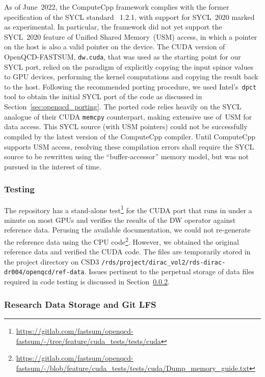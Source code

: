 \documentclass[../main]{subfiles}
\begin{document}
As of June~2022, the ComputeCpp framework complies with the former specification of the SYCL standard \viz~1.2.1, with support for SYCL~2020 marked as experimental.
In particular, the framework did not yet support the SYCL~2020 feature of Unified Shared Memory~(USM) access, in which a pointer on the host is also a valid pointer on the device.
The CUDA version of OpenQCD-FASTSUM, \texttt{dw.cuda}, that was used as the starting point for our SYCL port, relied on the paradigm of explicitly copying the input spinor values to GPU devices, performing the kernel computations and copying the result back to the host.
Following the recommended porting procedure, we used Intel's~\texttt{dpct} tool to obtain the initial SYCL port of the code as discussed in Section~\ref{sec:openqcd_porting}.
The ported code relies heavily on the SYCL analogue of their CUDA \texttt{memcpy} counterpart, making extensive use of~USM for data access.
This SYCL source (with USM pointers) could not be successfully compiled by the latest version of the ComputeCpp compiler.
Until ComputeCpp supports USM access, resolving these compilation errors shall require the SYCL source to be rewritten using the ``buffer-accessor'' memory model, but was not pursued in the interest of time.

\subsubsection{Testing}\label{testing_openqcd}

The repository has a stand-alone test\footnote{\url{https://gitlab.com/fastsum/openqcd-fastsum/-/tree/feature/cuda_tests/tests/cuda}} for the CUDA port that runs in under a minute on most GPUs and verifies the results of the DW operator against reference data.
Perusing the available documentation, we could not re-generate the reference data using the CPU code\footnote{\url{https://gitlab.com/fastsum/openqcd-fastsum/-/blob/feature/cuda_tests/tests/cuda/Dump_memory_guide.txt}}.
However, we obtained the original reference data and verified the CUDA code.
The files are temporarily stored in the project directory on CSD3 \texttt{/rds/project/dirac\_vol2/rds-dirac-dr004/openqcd/ref-data}.
Issues pertinent to the perpetual storage of data files required in code testing is discussed in Section~\ref{sec:gitlfs_rds}.

\subsubsection{Research Data Storage and Git LFS}\label{sec:gitlfs_rds}
\end{document}
